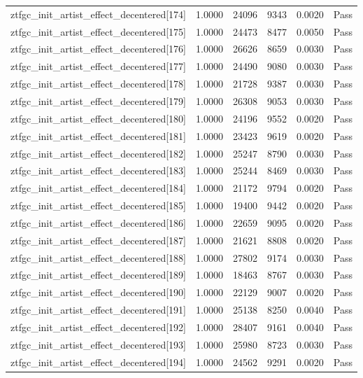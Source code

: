 \begin{table}[htbp]
\begin{tabular}{llrrll}
ztfgc\_init\_artist\_effect\_decentered[174] & 1.0000 & 24096 & 9343 & 0.0020 & Pass \\
ztfgc\_init\_artist\_effect\_decentered[175] & 1.0000 & 24473 & 8477 & 0.0050 & Pass \\
ztfgc\_init\_artist\_effect\_decentered[176] & 1.0000 & 26626 & 8659 & 0.0030 & Pass \\
ztfgc\_init\_artist\_effect\_decentered[177] & 1.0000 & 24490 & 9080 & 0.0030 & Pass \\
ztfgc\_init\_artist\_effect\_decentered[178] & 1.0000 & 21728 & 9387 & 0.0030 & Pass \\
ztfgc\_init\_artist\_effect\_decentered[179] & 1.0000 & 26308 & 9053 & 0.0030 & Pass \\
ztfgc\_init\_artist\_effect\_decentered[180] & 1.0000 & 24196 & 9552 & 0.0020 & Pass \\
ztfgc\_init\_artist\_effect\_decentered[181] & 1.0000 & 23423 & 9619 & 0.0020 & Pass \\
ztfgc\_init\_artist\_effect\_decentered[182] & 1.0000 & 25247 & 8790 & 0.0030 & Pass \\
ztfgc\_init\_artist\_effect\_decentered[183] & 1.0000 & 25244 & 8469 & 0.0030 & Pass \\
ztfgc\_init\_artist\_effect\_decentered[184] & 1.0000 & 21172 & 9794 & 0.0020 & Pass \\
ztfgc\_init\_artist\_effect\_decentered[185] & 1.0000 & 19400 & 9442 & 0.0020 & Pass \\
ztfgc\_init\_artist\_effect\_decentered[186] & 1.0000 & 22659 & 9095 & 0.0020 & Pass \\
ztfgc\_init\_artist\_effect\_decentered[187] & 1.0000 & 21621 & 8808 & 0.0020 & Pass \\
ztfgc\_init\_artist\_effect\_decentered[188] & 1.0000 & 27802 & 9174 & 0.0030 & Pass \\
ztfgc\_init\_artist\_effect\_decentered[189] & 1.0000 & 18463 & 8767 & 0.0030 & Pass \\
ztfgc\_init\_artist\_effect\_decentered[190] & 1.0000 & 22129 & 9007 & 0.0020 & Pass \\
ztfgc\_init\_artist\_effect\_decentered[191] & 1.0000 & 25138 & 8250 & 0.0040 & Pass \\
ztfgc\_init\_artist\_effect\_decentered[192] & 1.0000 & 28407 & 9161 & 0.0040 & Pass \\
ztfgc\_init\_artist\_effect\_decentered[193] & 1.0000 & 25980 & 8723 & 0.0030 & Pass \\
ztfgc\_init\_artist\_effect\_decentered[194] & 1.0000 & 24562 & 9291 & 0.0020 & Pass \\

\end{tabular}
\end{table}
